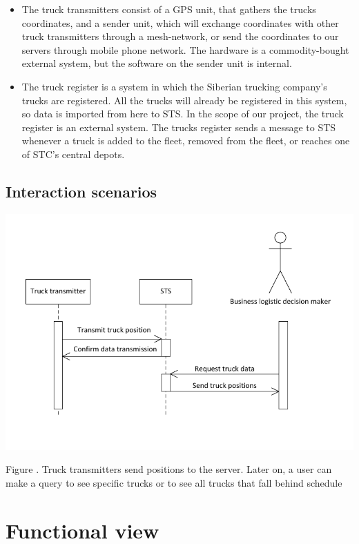 \documentclass[a4paper,11pt]{report}
\newcommand{\mycaption}[1]{
  \addtocounter{figures}{1}
  Figure \arabic{figures}. #1
}
\begin{document}
\begin{itemize}
\item The truck transmitters consist of a GPS unit, that gathers the trucks coordinates, and a sender unit, which will exchange coordinates with other truck transmitters through a mesh-network, or send the coordinates to our servers through mobile phone network. The hardware is a commodity-bought external system, but the software on the sender unit is internal.
\item The truck register is a system in which the Siberian trucking company's trucks are registered.  All the trucks will already be registered in this system, so data is imported from here to STS.  In the scope of our project, the truck register is an external system.  The trucks register sends a message to STS whenever a truck is added to the fleet, removed from the fleet, or reaches one of STC's central depots.
\end{itemize}


\subsection{Interaction scenarios}
\label{sec:inter-scen}

\begin{center}
  \includegraphics[width=\textwidth]{figures/interaction_scenario_1}\\
  \mycaption{Truck transmitters send positions to the server.  Later on, a user can make a query to see specific trucks or to see all trucks that fall behind schedule}
\end{center}



\section{Functional view}
\label{sec:functional-view}
\end{document}
